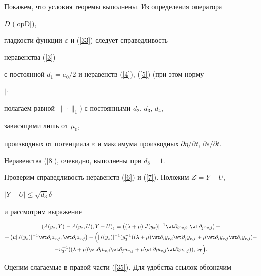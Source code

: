 Покажем, что условия теоремы выполнены. Из определения оператора 


$D$ (\ref{opD}), 


гладкости функции $\varepsilon $  и (\ref{33}) следует справедливость 


неравенства (\ref{3}) 


с постоянной  $d_1=c_0 /2$ и неравенств (\ref{4}), (\ref{5}) (при этом норму 


$|\cdot |$ 


полагаем равной  $\|\cdot \|_1$) с постоянными $d_2$, $d_3$, $d_4$,  


зависящими лишь от $\mu_0$, 


производных от потенциала $\varepsilon $  и максимума производных $\partial 


\eta /\partial t$, $\partial s /\partial t$. 


Неравенства (\ref{8}), очевидно, выполнены при $d_8=1$.





Проверим справедливость неравенств (\ref{6}) и (\ref{7}). Положим  $Z=Y-U$, 


$|Y-U|\leq \sqrt{d_3}\delta$


и рассмотрим выражение


\begin{multline} 


\label{35}


\Scal{A(y_x,Y)-A(y_x,U),Y-U}_1=\Scal{(\lambda+\mu)|J(y_x)|^{-1}


\wt \partial_{i}z_{v,i}, \wt \partial_{j}z_{v,j}}+ \\


%


+\Scal{\mu|J(y_x)|^{-1} \wt \partial_{i}z_{v,j},


\wt \partial_{i}z_{v,j}}-\Big(|J(y_x)|^{-1}( y_T^{-1}(


(\lambda+\mu) \wt \partial_{i}y_{v,i}\wt \partial_{j}y_{v,j}


+\mu \wt \partial_{i}y_{v,j}\wt \partial_{i}y_{v,j}) -\\


%


-u_T^{-1}((\lambda+\mu) \wt \partial_{i}u_{v,i}\wt \partial_{j}u_{v,j}


+\mu \wt \partial_{i}u_{v,j}\wt \partial_{i}u_{v,j})),z_T\Big).


\end{multline}


Оценим слагаемые  в правой части (\ref{35}). Для удобства ссылок обозначим 


